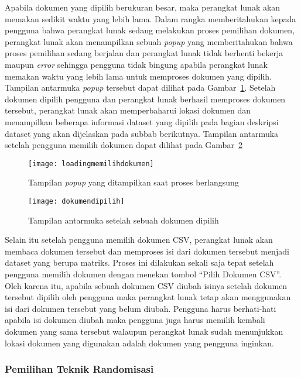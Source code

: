 Apabila dokumen yang dipilih berukuran besar, maka perangkat lunak akan memakan sedikit waktu yang lebih lama. Dalam rangka memberitahukan kepada pengguna bahwa perangkat lunak sedang melakukan proses pemilihan dokumen, perangkat lunak akan menampilkan sebuah \textit{popup} yang memberitahukan bahwa proses pemilihan sedang berjalan dan perangkat lunak tidak berhenti bekerja maupun \textit{error} sehingga pengguna tidak bingung apabila perangkat lunak memakan waktu yang lebih lama untuk memproses dokumen yang dipilih. Tampilan antarmuka \textit{popup} tersebut dapat dilihat pada Gambar~\ref{fig:loadingmemilihdokumen}. Setelah dokumen dipilih pengguna dan perangkat lunak berhasil memproses dokumen tersebut, perangkat lunak akan memperbaharui lokasi dokumen dan menampilkan beberapa informasi dataset yang dipilih pada bagian deskripsi dataset yang akan dijelaskan pada subbab berikutnya. Tampilan antarmuka setelah pengguna memilih dokumen dapat dilihat pada Gambar~\ref{fig:dokumendipilih}

\begin{figure}
	\centering
	\texttt{[image: loadingmemilihdokumen]}
	\caption{Tampilan \textit{popup} yang ditampilkan saat proses berlangsung}
	\label{fig:loadingmemilihdokumen}
\end{figure}

\begin{figure}
	\centering
	\texttt{[image: dokumendipilih]}
	\caption{Tampilan antarmuka setelah sebuah dokumen dipilih}
	\label{fig:dokumendipilih}
\end{figure}

Selain itu setelah pengguna memilih dokumen CSV, perangkat lunak akan membaca dokumen tersebut dan memproses isi dari dokumen tersebut menjadi dataset yang berupa matriks. Proses ini dilakukan sekali saja tepat setelah pengguna memilih dokumen dengan menekan tombol \textquotedblleft Pilih Dokumen CSV\textquotedblright. Oleh karena itu, apabila sebuah dokumen CSV diubah isinya setelah dokumen tersebut dipilih oleh pengguna maka perangkat lunak tetap akan menggunakan isi dari dokumen tersebut yang belum diubah. Pengguna harus berhati-hati apabila isi dokumen diubah maka pengguna juga harus memilih kembali dokumen yang sama tersebut walaupun perangkat lunak sudah menunjukkan lokasi dokumen yang digunakan adalah dokumen yang pengguna inginkan.

\subsubsection{Pemilihan Teknik Randomisasi}
\label{sec:pilihteknik}

